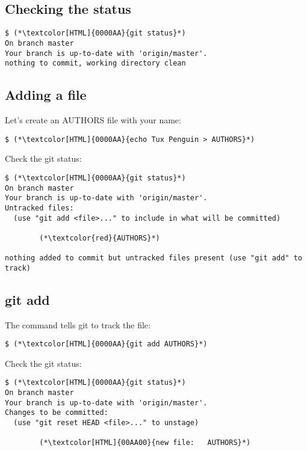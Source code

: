 \subsection{Checking the status}
\begin{frame}[fragile]
  \subslidetitle
  \begin{lstlisting}
$ (*\textcolor[HTML]{0000AA}{git status}*)
On branch master
Your branch is up-to-date with 'origin/master'.
nothing to commit, working directory clean
  \end{lstlisting}
\end{frame}


\subsection{Adding a file}
\begin{frame}[fragile]
  \subslidetitle

  Let's create an AUTHORS file with your name:
  \begin{lstlisting}
$ (*\textcolor[HTML]{0000AA}{echo Tux Penguin > AUTHORS}*)
  \end{lstlisting}

  Check the git status:
  \begin{lstlisting}
$ (*\textcolor[HTML]{0000AA}{git status}*)
On branch master
Your branch is up-to-date with 'origin/master'.
Untracked files:
  (use "git add <file>..." to include in what will be committed)

        (*\textcolor{red}{AUTHORS}*)

nothing added to commit but untracked files present (use "git add" to track)
  \end{lstlisting}

\end{frame}

\subsection{git add}
\begin{frame}[fragile]
  \subslidetitle

  The command  tells git to track the file:
  \begin{lstlisting}
$ (*\textcolor[HTML]{0000AA}{git add AUTHORS}*)
  \end{lstlisting}

  Check the git status:
  \begin{lstlisting}
$ (*\textcolor[HTML]{0000AA}{git status}*)
On branch master
Your branch is up-to-date with 'origin/master'.
Changes to be committed:
  (use "git reset HEAD <file>..." to unstage)

        (*\textcolor[HTML]{00AA00}{new file:   AUTHORS}*)
  \end{lstlisting}

\end{frame}


